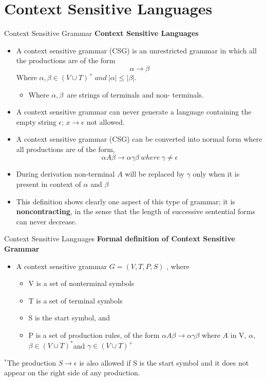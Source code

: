 \documentclass{beamer}
\begin{document}
\section{Context Sensitive Languages}
\begin{frame}{Context Sensitive Grammar}
\textbf{Context Sensitive Languages}
\begin{itemize}
	\item A context sensitive grammar (CSG) is an unrestricted grammar in which all the productions are of the form
	$$\alpha \rightarrow \beta$$ Where $\alpha, \beta \in (V\cup T)^+\  and\  |\alpha |\leq | \beta |.$
	\begin{itemize}
		\item Where $\alpha, \beta $\ are strings of terminals and non- terminals.
	\end{itemize}
\item A context sensitive grammar can never generate a language containing the empty string $\epsilon$; $x\rightarrow \epsilon$ not allowed.
\item A context sensitive grammar (CSG) can be converted into normal form where all productions are of the form,
$$\alpha A\beta \rightarrow \alpha \gamma \beta\  where\ \gamma \neq \epsilon$$
\item During derivation non-terminal $A$ will be replaced by $\gamma$ only when it is present in context of $\alpha$ and $\beta$
\item This definition shows clearly one aspect of this type of grammar; it is
\textbf{noncontracting}, in the sense that the length of successive sentential
forms can never decrease.
\end{itemize}
\end{frame}
\begin{frame}{Context Sensitive Languages}
	\textbf{Formal definition of Context Sensitive Grammar}
	\begin{itemize}
		\item A context sensitive grammar $G = (V, T, P, S)$ , where
		\begin{itemize}
			\item V is a set of nonterminal symbols
			\item T is a set of terminal symbols
			\item S is the start symbol, and
			\item P is a set of production rules, of the form $\alpha A \beta \rightarrow \alpha \gamma \beta$ where $A$ in V, $\alpha$, $\beta \in (V\cup T)^*$and $\gamma \in  (V \cup T)^+$
		\end{itemize}
	\end{itemize}
	$^*$The production $S \rightarrow \epsilon$ is also allowed if S is the start symbol and it does not appear on the right side of any production.
\end{frame}
\end{document}
